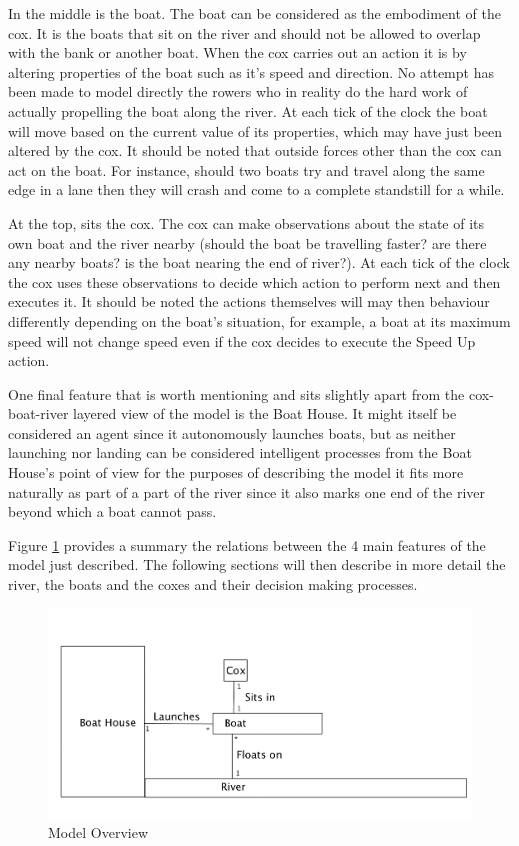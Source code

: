     In the middle is the boat. The boat can be considered as the embodiment of the cox. It is the boats that sit on the river and should not be allowed to overlap with the bank or another boat. When the cox carries out an action it is by altering properties of the boat such as it's speed and direction. No attempt has been made to model directly the rowers who in reality do the hard work of actually propelling the boat along the river. At each tick of the clock the boat will move based on the current value of its properties, which may have just been altered by the cox. It should be noted that outside forces other than the cox can act on the boat. For instance, should two boats try and travel along the same edge in a lane then they will crash and come to a complete standstill for a while.
    
    At the top, sits the cox. The cox can make observations about the state of its own boat and the river nearby (should the boat be travelling faster? are there any nearby boats? is the boat nearing the end of river?). At each tick of the clock the cox uses these observations to decide which action to perform next and then executes it. It should be noted the actions themselves will may then behaviour differently depending on the boat's situation, for example, a boat at its maximum speed will not change speed even if the cox decides to execute the Speed Up action.
    
    One final feature that is worth mentioning and sits slightly apart from the cox-boat-river layered view of the model is the Boat House. It might itself be considered an agent since it autonomously launches boats, but as neither launching nor landing can be considered intelligent processes from the Boat House's point of view for the purposes of describing the model it fits more naturally as part of a part of the river since it also marks one end of the river beyond which a boat cannot pass.
    
    Figure \ref{fig:modeloverview} provides a summary the relations between the 4 main features of the model just described. The following sections will then describe in more detail the river, the boats and the coxes and their decision making processes.
    
    \begin{figure}[H]
    \begin{center}
    	\includegraphics[scale=0.3]{images/ModelOverview.png}
    	\caption{Model Overview}
    	\label{fig:modeloverview}
    \end{center}
    \end{figure}
    
